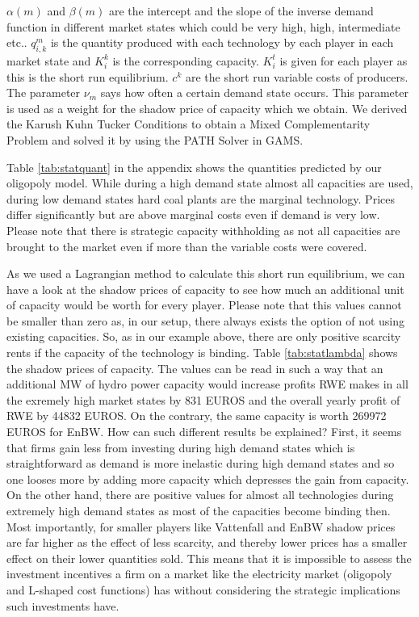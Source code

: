 $\alpha(m)$ and $\beta(m)$ are the intercept and the slope of the inverse demand function in different market states which could be very high, high, intermediate etc.. $q_{i,k}^m$ is the quantity produced with each technology by each player in each market state and $K_i^k$ is the corresponding capacity. $K_i^t$ is given for each player as this is the short run equilibrium. $c^k$ are the short run variable costs of producers. The parameter $\nu_m $ says how often a certain demand state occurs. This parameter is used as a weight for the shadow price of capacity which we obtain. We derived the Karush Kuhn Tucker Conditions to obtain a Mixed Complementarity Problem and solved it by using the PATH Solver in GAMS.

Table \ref{tab:statquant} in the appendix shows the quantities predicted by our oligopoly model. While during a high demand state almost all capacities are used, during low demand states hard coal plants are the marginal technology. Prices differ significantly but are above marginal costs even if demand is very low. Please note that there is strategic capacity withholding as not all capacities are brought to the market even if more than the variable costs were covered.

As we used a Lagrangian method to calculate this short run equilibrium, we can have a look at the shadow prices of capacity to see how much an additional unit of capacity would be worth for every player. Please note that this values cannot be smaller than zero as, in our setup, there always exists the option of not using existing capacities. So, as in our example above, there are only positive scarcity rents if the capacity of the technology is binding. Table \ref{tab:statlambda} shows the shadow prices of capacity. The values can be read in such a way that an additional MW of hydro power capacity would increase profits RWE makes in all the exremely high market states by 831 EUROS and the overall yearly profit of RWE by 44832 EUROS. On the contrary, the same capacity is worth 269972 EUROS for EnBW. How can such different results be explained? First, it seems that firms gain less from investing during high demand states which is straightforward as demand is more inelastic during high demand states and so one looses more by adding more capacity which depresses the gain from capacity. On the other hand, there are positive values for almost all technologies during extremely high demand states as most of the capacities become binding then.
Most importantly, for smaller players like Vattenfall and EnBW shadow prices are far higher as the effect of less scarcity, and thereby lower prices has a smaller effect on their lower quantities sold. This means that it is impossible to assess the investment incentives a firm on a market like the electricity market (oligopoly and L-shaped cost functions) has without considering the strategic implications such investments have.






